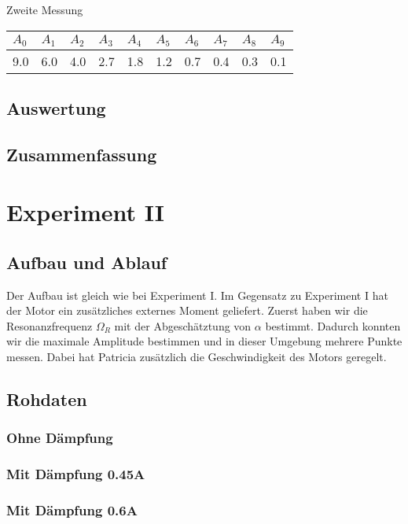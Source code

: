 \documentclass[12pt,a4paper]{article}
\begin{document}
Zweite Messung

\vspace{3pt}
\begin{tabular}{|l|l|l|l|l|l|l|l|l|l|}
\hline
$A_{0}$&$A_{1}$&$A_{2}$&$A_{3}$&$A_{4}$&$A_{5}$&$A_{6}$&$A_{7}$&$A_{8}$&$A_{9}$\\
\hline
9.0&6.0&4.0&2.7&1.8&1.2&0.7&0.4&0.3&0.1\\
\hline
\end{tabular}

\subsection*{Auswertung}

\subsection*{Zusammenfassung}

\section*{Experiment II}

\subsection*{Aufbau und Ablauf}
Der Aufbau ist gleich wie bei Experiment I. Im Gegensatz zu Experiment I hat der Motor ein zus\"atzliches externes Moment geliefert. 
Zuerst haben wir die Resonanzfrequenz $\Omega_R$ mit der Abgesch\"atztung von $\alpha$ bestimmt. Dadurch konnten wir die maximale Amplitude bestimmen und in dieser Umgebung mehrere Punkte messen.
Dabei hat Patricia zus\"atzlich die Geschwindigkeit des Motors geregelt.

\subsection*{Rohdaten}
\subsubsection*{Ohne D\"ampfung}

\subsubsection*{Mit D\"ampfung 0.45A}

\subsubsection*{Mit D\"ampfung 0.6A}
\end{document}
